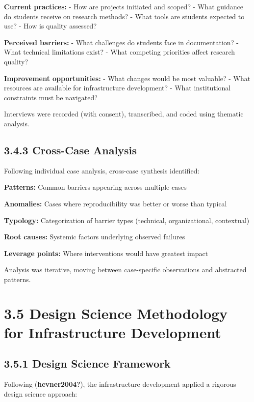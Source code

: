 \documentclass[
  oneside,
  open=any]{scrbook}
\begin{document}
\textbf{Current practices:} - How are projects initiated and scoped? -
What guidance do students receive on research methods? - What tools are
students expected to use? - How is quality assessed?

\textbf{Perceived barriers:} - What challenges do students face in
documentation? - What technical limitations exist? - What competing
priorities affect research quality?

\textbf{Improvement opportunities:} - What changes would be most
valuable? - What resources are available for infrastructure development?
- What institutional constraints must be navigated?

Interviews were recorded (with consent), transcribed, and coded using
thematic analysis.

\subsection{3.4.3 Cross-Case Analysis}\label{cross-case-analysis}

Following individual case analysis, cross-case synthesis identified:

\textbf{Patterns:} Common barriers appearing across multiple cases

\textbf{Anomalies:} Cases where reproducibility was better or worse than
typical

\textbf{Typology:} Categorization of barrier types (technical,
organizational, contextual)

\textbf{Root causes:} Systemic factors underlying observed failures

\textbf{Leverage points:} Where interventions would have greatest impact

Analysis was iterative, moving between case-specific observations and
abstracted patterns.

\section{3.5 Design Science Methodology for Infrastructure
Development}\label{design-science-methodology-for-infrastructure-development}

\subsection{3.5.1 Design Science
Framework}\label{design-science-framework}

Following (\textbf{hevner2004?}), the infrastructure development applied
a rigorous design science approach:
\end{document}
